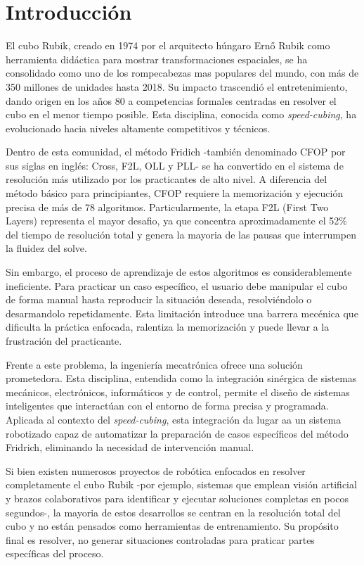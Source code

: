 \section{Introducción}
El cubo Rubik, creado en 1974 por el arquitecto húngaro Ernő Rubik como herramienta didáctica para mostrar transformaciones espaciales, se ha consolidado como uno de los rompecabezas mas populares del mundo, con más de 350 millones de unidades hasta 2018\cite{Reese2020}. Su impacto trascendió el entretenimiento, dando origen en los años 80 a competencias formales centradas en resolver el cubo en el menor tiempo posible. Esta disciplina, conocida como \textit{speed-cubing}, ha evolucionado hacia niveles altamente competitivos y técnicos.

Dentro de esta comunidad, el método Fridich -también denominado CFOP por sus siglas en inglés: Cross, F2L, OLL y PLL- se ha convertido en el sistema de resolución más utilizado por los practicantes de alto nivel\cite{Boyce2022b}. A diferencia del método básico para principiantes, CFOP requiere la memorización y ejecución precisa de más de 78 algoritmos. Particularmente, la etapa F2L (First Two Layers) representa el mayor desafio, ya que concentra aproximadamente el 52\% del tiempo de resolución total y genera la mayoria de las pausas que interrumpen la fluidez del solve\cite{Boyce2022b}.

Sin embargo, el proceso de aprendizaje de estos algoritmos es considerablemente ineficiente. Para practicar un caso específico, el usuario debe manipular el cubo de forma manual hasta reproducir la situación deseada, resolviéndolo o desarmandolo repetidamente. Esta limitación introduce una barrera mecénica que dificulta la práctica enfocada, ralentiza la memorización y puede llevar a la frustración del practicante.

Frente a este problema, la ingeniería mecatrónica ofrece una solución prometedora. Esta disciplina, entendida como la integración sinérgica de sistemas mecánicos, electrónicos, informáticos y de control, permite el diseño de sistemas inteligentes que interactúan con el entorno de forma precisa y programada\cite{Perdomo2003}. Aplicada al contexto del \textit{speed-cubing}, esta integración da lugar aa un sistema robotizado capaz de automatizar la preparación de casos específicos del método Fridrich, eliminando la necesidad de intervención manual.

Si bien existen numerosos proyectos de robótica enfocados en resolver completamente el cubo Rubik -por ejemplo, sistemas que emplean visión artificial y brazos colaborativos para identificar y ejecutar soluciones completas en pocos segundos\cite{Gorriz2023}-, la mayoria de estos desarrollos se centran en la resolución total del cubo y no están pensados como herramientas de entrenamiento. Su propósito final es resolver, no generar situaciones controladas para praticar partes específicas del proceso. 

